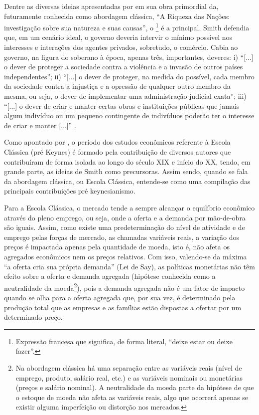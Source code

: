 Dentre as diversas ideias apresentadas por  em sua obra primordial da, futuramente conhecida como abordagem clássica, \enquote{A Riqueza das Nações: investigação sobre sua natureza e suas causas}, o \footnote{Expressão francesa que significa, de forma literal, \enquote{deixe estar ou deixe fazer}.} é a principal. Smith defendia que, em um cenário ideal, o governo deveria intervir o mínimo possível nos interesses e interações dos agentes privados, sobretudo, o comércio. Cabia ao governo, na figura do soberano à época, apenas três, importantes, deveres: i) \enquote{[...] o dever de proteger a sociedade contra a violência e a invasão de outros países independentes}; ii) \enquote{[...] o dever de proteger, na medida do possível, cada membro da sociedade contra a injustiça e a opressão de qualquer outro membro da mesma, ou seja, o dever de implementar uma administração judicial exata}; iii) \enquote{[...] o dever de criar e manter certas obras e instituições públicas que jamais algum indivíduo ou um pequeno contingente de indivíduos poderão ter o interesse de criar e manter [...]} \cite[pg.170]{smith2020riquezav2}.

Como apontado por , o período dos estudos econômicos referente à Escola Clássica (pré Keynes) é formado pela contribuição de diversos autores que contribuíram de forma isolada ao longo do século XIX e início do XX, tendo, em grande parte, as ideias de Smith como precursoras. Assim sendo, quando se fala da abordagem clássica, ou Escola Clássica, entende-se como uma compilação das principais contribuições pré keynesianismo.

Para a Escola Clássica, o mercado tende a sempre alcançar o equilíbrio econômico através do pleno emprego, ou seja, onde a oferta e a demanda por mão-de-obra são iguais. Assim, como existe uma predeterminação do nível de atividade e de emprego pelas forças de mercado, as chamadas variáveis reais, a variação dos preços é impactada apenas pela quantidade de moeda, isto é, não afeta os agregados econômicos nem os preços relativos. Com isso, valendo-se da máxima \enquote{a oferta cria sua própria demanda} (Lei de Say), as políticas monetárias não têm efeito sobre a oferta e demanda agregada (hipótese conhecida como a neutralidade da moeda\footnote{Na abordagem clássica há uma separação entre as variáveis reais (nível de emprego, produto, salário real, etc.) e as variáveis nominais ou monetárias (preços e salário nominal). A neutralidade da moeda parte da hipótese de que o estoque de moeda não afeta as variáveis reais, algo que ocorrerá apenas se existir alguma imperfeição ou distorção nos mercados.}), pois a demanda agregada não é um fator de impacto quando se olha para a oferta agregada que, por sua vez, é determinado pela produção total que as empresas e as famílias estão dispostas a ofertar por um determinado preço.

